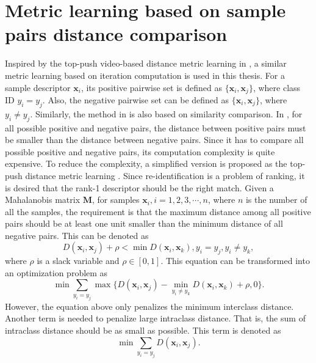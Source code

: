  \section{Metric learning based on sample pairs distance comparison}
Inspired by the top-push video-based distance metric  learning in \cite{TDL}, a similar metric learning based on iteration computation is used in this thesis. For a  sample descriptor $\bm{x}_i$,  its positive pairwise set is defined as $\{\bm{x}_i,\bm{x}_j\}$, where class ID $y_i = y_j$. Also, the negative pairwise set can be defined as $\{\bm{x}_i,\bm{x}_j\}$, where $y_i \ne y_j$. Similarly, the method in \cite{PRDC} is also based on similarity comparison. In \cite{PRDC}, for all possible positive and negative pairs, the distance between positive pairs must be smaller than the distance between negative pairs. Since it has to compare all possible positive and negative pairs, its computation complexity is quite expensive. To reduce the complexity, a simplified version is proposed as the top-push distance metric learning \cite{TDL}.  Since re-identification is a problem of ranking, it is desired that the rank-1 descriptor should be the right match. Given a Mahalanobis matrix $\bm{M}$, for samples $\bm{x}_i, i = 1,2,3,\cdots,n$, where $n$ is the number of all the samples, the requirement is that the maximum distance among all positive pairs should be at least one unit smaller than the minimum distance of all negative pairs. This can be denoted as 
 \begin{equation}
 D(\bm{x}_i,\bm{x}_j) + \rho < \min D(\bm{x}_i,\bm{x}_k), y_i = y_j, y_i\ne y_k,
 \end{equation}
 where $\rho$ is a slack variable and $\rho \in [0,1]$. This equation can be transformed into an optimization problem as
 \begin{equation}
 \label{term1}
 \min \sum_{y_i = y_j} \max \{D(\bm{x}_i,\bm{x}_j) -  \min_{ y_i\ne y_k} D(\bm{x}_i,\bm{x}_k)  + \rho , 0\}.
 \end{equation}
However, the equation above only penalizes the minimum interclass distance. Another term is needed to penalize large intraclass distance. That is, the sum of intraclass distance should be as small as possible. This term is denoted as 
 \begin{equation} \label{term2}
 \min \sum_{y_i = y_j} D(\bm{x}_i,\bm{x}_j).
 \end{equation}

